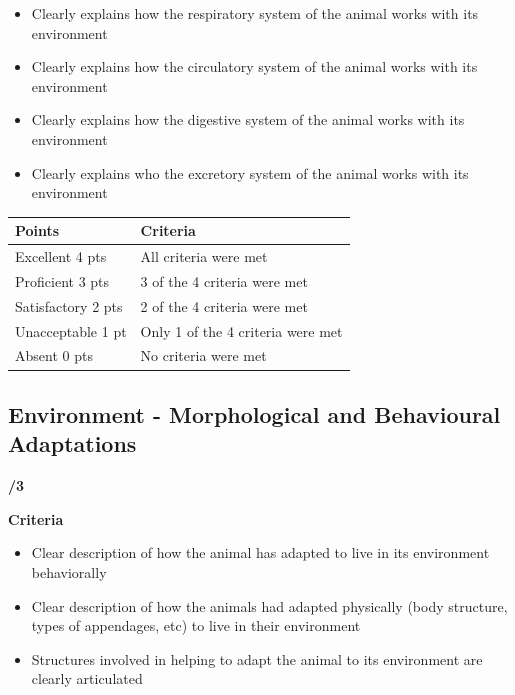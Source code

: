 \documentclass[
]{book}
\providecommand{\tightlist}{%
  \setlength{\itemsep}{0pt}\setlength{\parskip}{0pt}}
\begin{document}
\begin{itemize}
\tightlist
\item
  Clearly explains how the respiratory system of the animal works with its environment
\item
  Clearly explains how the circulatory system of the animal works with its environment
\item
  Clearly explains how the digestive system of the animal works with its environment
\item
  Clearly explains who the excretory system of the animal works with its environment
\end{itemize}

\begin{longtable}[]{@{}ll@{}}
\toprule()
Points & Criteria \\
\midrule()
\endhead
Excellent 4 pts & All criteria were met \\
Proficient 3 pts & 3 of the 4 criteria were met \\
Satisfactory 2 pts & 2 of the 4 criteria were met \\
Unacceptable 1 pt & Only 1 of the 4 criteria were met \\
Absent 0 pts & No criteria were met \\
\bottomrule()
\end{longtable}

\hypertarget{environment---morphological-and-behavioural-adaptations}{%
\subsection*{Environment - Morphological and Behavioural Adaptations}\label{environment---morphological-and-behavioural-adaptations}}

\textbf{/3}

\textbf{Criteria}

\begin{itemize}
\tightlist
\item
  Clear description of how the animal has adapted to live in its environment behaviorally
\item
  Clear description of how the animals had adapted physically (body structure, types of appendages, etc) to live in their environment
\item
  Structures involved in helping to adapt the animal to its environment are clearly articulated
\end{itemize}
\end{document}
